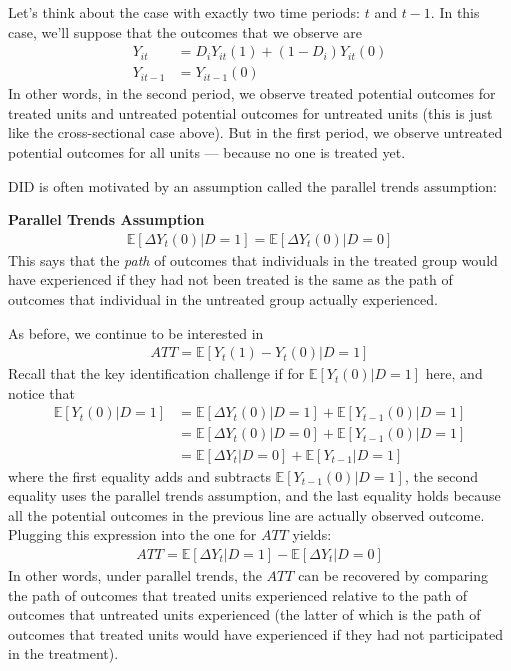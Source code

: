 \documentclass[
  letterpaper,
  DIV=11,
  numbers=noendperiod]{scrreprt}
\begin{document}
Let's think about the case with exactly two time periods: \(t\) and
\(t-1\). In this case, we'll suppose that the outcomes that we observe
are \begin{align*}
  Y_{it} &= D_i Y_{it}(1) + (1-D_i) Y_{it}(0) \\
  Y_{it-1} &= Y_{it-1}(0)
\end{align*} In other words, in the second period, we observe treated
potential outcomes for treated units and untreated potential outcomes
for untreated units (this is just like the cross-sectional case above).
But in the first period, we observe untreated potential outcomes for all
units --- because no one is treated yet.

DID is often motivated by an assumption called the parallel trends
assumption:

\textbf{Parallel Trends Assumption} \begin{align*}
\mathbb{E}[\Delta Y_t(0) | D=1] = \mathbb{E}[\Delta Y_t(0) | D=0]
\end{align*} This says that the \emph{path} of outcomes that individuals
in the treated group would have experienced if they had not been treated
is the same as the path of outcomes that individual in the untreated
group actually experienced.

As before, we continue to be interested in \begin{align*}
  ATT = \mathbb{E}[Y_t(1) - Y_t(0) | D=1]
\end{align*} Recall that the key identification challenge if for
\(\mathbb{E}[Y_t(0)|D=1]\) here, and notice that \begin{align*}
  \mathbb{E}[Y_t(0) | D=1] &= \mathbb{E}[\Delta Y_t(0) | D=1] + \mathbb{E}[Y_{t-1}(0) | D=1] \\
  &= \mathbb{E}[\Delta Y_t(0) | D=0] + \mathbb{E}[Y_{t-1}(0)|D=1] \\
  &= \mathbb{E}[\Delta Y_t | D=0] + \mathbb{E}[Y_{t-1}|D=1]
\end{align*} where the first equality adds and subtracts
\(\mathbb{E}[Y_{t-1}(0)|D=1]\), the second equality uses the parallel
trends assumption, and the last equality holds because all the potential
outcomes in the previous line are actually observed outcome. Plugging
this expression into the one for \(ATT\) yields: \begin{align*}
  ATT = \mathbb{E}[\Delta Y_t | D=1] - \mathbb{E}[\Delta Y_t | D=0]
\end{align*} In other words, under parallel trends, the \(ATT\) can be
recovered by comparing the path of outcomes that treated units
experienced relative to the path of outcomes that untreated units
experienced (the latter of which is the path of outcomes that treated
units would have experienced if they had not participated in the
treatment).
\end{document}
